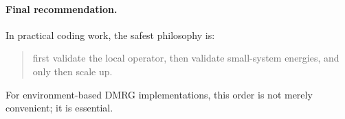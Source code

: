 \documentclass[aps,prb,onecolumn,nofootinbib]{revtex4-2}
\begin{document}
	\paragraph{Final recommendation.}
	In practical coding work, the safest philosophy is:
	\begin{quote}
		first validate the local operator, then validate small-system energies, and only then scale up.
	\end{quote}
	For environment-based DMRG implementations, this order is not merely convenient; it is essential.
	
	
\end{document}
